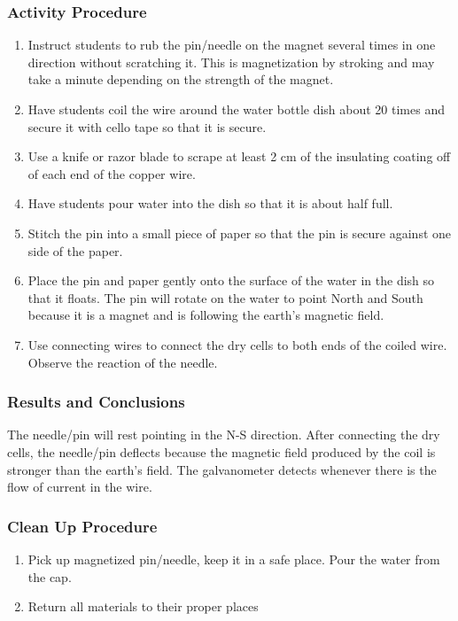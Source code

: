 \subsubsection*{Activity Procedure}
\begin{enumerate}
\item{Instruct students to rub the pin/needle on the magnet several times in one direction without scratching it. This is magnetization by stroking and may take a minute depending on the strength of the magnet.} 
\item{Have students coil the wire around the water bottle dish about 20 times and secure it with cello tape so that it is secure.} 
\item{Use a knife or razor blade to scrape at least 2 cm of the insulating coating off of each end of the copper wire.} 
\item{Have students pour water into the dish so that it is about half full.} 
\item{Stitch the pin into a small piece of paper so that the pin is secure against one side of the paper.} 
\item{Place the pin and paper gently onto the surface of the water in the dish so that it floats. The pin will rotate on the water to point North and South because it is a magnet and is following the earth's magnetic field.} 
\item{Use connecting wires to connect the dry cells to both ends of the coiled wire. Observe the reaction of the needle.} 
\end{enumerate}

\subsubsection*{Results and Conclusions}
The needle/pin will rest pointing in the N-S direction. After connecting the dry cells, the needle/pin deflects because the magnetic field produced by the coil is stronger than the earth's field. The galvanometer detects whenever there is the flow of current in the wire.  

\subsubsection*{Clean Up Procedure}
\begin{enumerate}
\item{Pick up magnetized pin/needle, keep it in a safe place. Pour the water from the cap.} 
\item{Return all materials to their proper places}
\end{enumerate}

